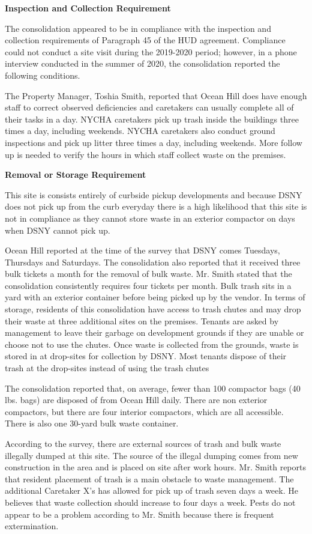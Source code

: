 
\textbf{Inspection and Collection Requirement}

The consolidation appeared to be in compliance with the inspection and collection requirements of Paragraph 45 of the HUD agreement. Compliance could not conduct a site visit during the 2019-2020 period; however, in a phone interview conducted in the summer of 2020, the consolidation reported the following conditions.

The Property Manager, Toshia Smith, reported that Ocean Hill does have enough staff to correct observed deficiencies and caretakers can usually complete all of their tasks in a day. NYCHA caretakers pick up trash inside the buildings three times a day, including weekends. NYCHA caretakers also conduct ground inspections and pick up litter three times a day, including weekends. More follow up is needed to verify the hours in which staff collect waste on the premises.

\textbf{Removal or Storage Requirement}

This site is consists entirely of curbside pickup developments and because DSNY does not pick up from the curb everyday there is a high likelihood that this site is not in compliance as they cannot store waste in an exterior compactor on days when DSNY cannot pick up.

Ocean Hill reported at the time of the survey that DSNY comes Tuesdays, Thursdays and Saturdays. The consolidation also reported that it received three bulk tickets a month for the removal of bulk waste. Mr. Smith stated that the consolidation consistently requires four tickets per month. Bulk trash sits in a yard with an exterior container before being picked up by the vendor. In terms of storage, residents of this consolidation have access to trash chutes and may drop their waste at three additional sites on the premises. Tenants are asked by management to leave their garbage on development grounds if they are unable or choose not to use the chutes. Once waste is collected from the grounds, waste is stored in at drop-sites for collection by DSNY. Most tenants dispose of their trash at the drop-sites instead of using the trash chutes

The consolidation reported that, on average, fewer than 100 compactor bags (40 lbs. bags)  are disposed of from Ocean Hill daily. There are non exterior compactors, but there are four interior compactors, which are all accessible. There is also one 30-yard bulk waste container.

According to the survey, there are external sources of trash and bulk waste illegally dumped at this site. The source of the illegal dumping comes from new construction in the area and is placed on site after work hours. Mr. Smith reports that resident placement of trash is a main obstacle to waste management. The additional Caretaker X's has allowed for pick up of trash seven days a week. He believes that waste collection should increase to four days a week. Pests do not appear to be a problem according to Mr. Smith because there is frequent extermination.